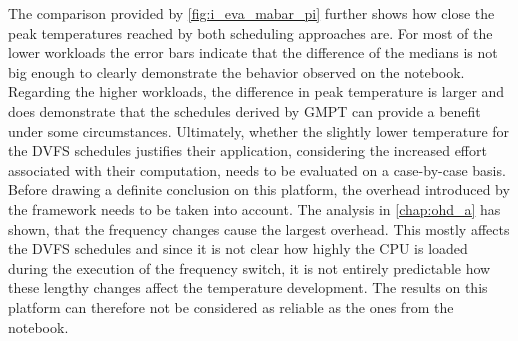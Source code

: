 The comparison provided by \autoref{fig:i_eva_mabar_pi} further shows how close the peak temperatures reached by both scheduling approaches are. For most of the lower workloads the error bars indicate that the difference of the medians is not big enough to clearly demonstrate the behavior observed on the notebook. Regarding the higher workloads, the difference in peak temperature is larger and does demonstrate that the schedules derived by GMPT can provide a benefit under some circumstances. Ultimately, whether the slightly lower temperature for the DVFS schedules justifies their application, considering the increased effort associated with their computation, needs to be evaluated on a case-by-case basis.\\
\hspace*{0.5ex}\hspace{0.5ex} Before drawing a definite conclusion on this platform, the overhead introduced by the framework needs to be taken into account. The analysis in \autoref{chap:ohd_a} has shown, that the frequency changes cause the largest overhead. This mostly affects the DVFS schedules and since it is not clear how highly the CPU is loaded during the execution of the frequency switch, it is not entirely predictable how these lengthy changes affect the temperature development. The results on this platform can therefore not be considered as reliable as the ones from the notebook.

